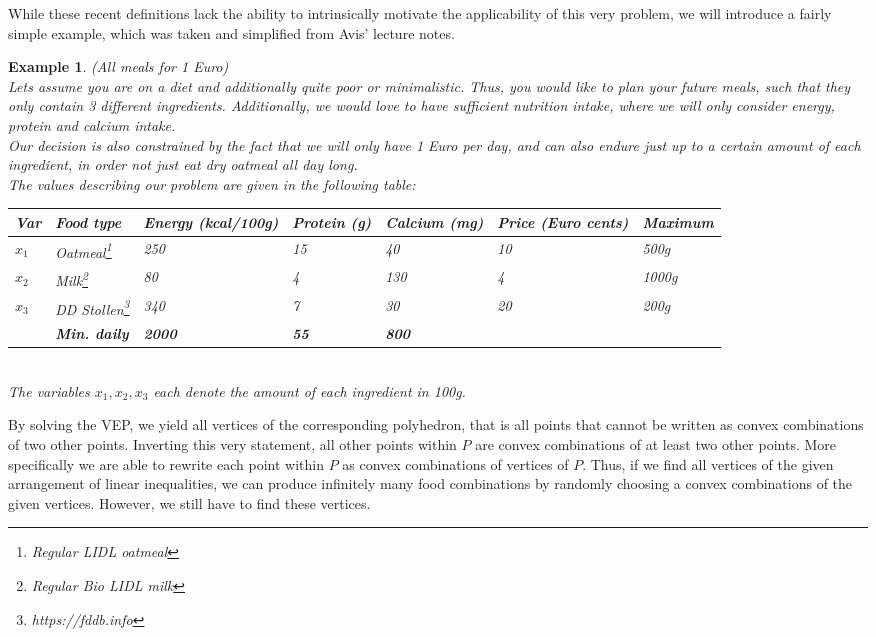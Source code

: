 \documentclass[a4paper, 11pt]{article}
\newtheorem{example}{Example}
\begin{document}
While these recent definitions lack the ability to intrinsically motivate the applicability of this very problem, we will introduce a fairly simple example, which was taken and simplified from Avis' lecture notes.
\begin{example}(All meals for 1 Euro)\\
	Lets assume you are on a diet and additionally quite poor or minimalistic. Thus, you would like to plan your future meals, such that they only contain 3 different ingredients. Additionally, we would love to have sufficient nutrition intake, where we will only consider energy, protein and calcium intake.\\
	Our decision is also constrained by the fact that we will only have 1 Euro per day, and can also endure just up to a certain amount of each ingredient, in order not just eat dry oatmeal all day long.\\
	The values describing our problem are given in the following table:\\
	\begingroup
	\def\arraystretch{1.5}
	\begin{tabular}{|p{0.5cm}|l|p{2cm}|p{1.5cm}|p{1.5cm}|p{1.5cm}|p{2cm}|}
		\hline
		Var&Food type&Energy (kcal/100g)&Protein (g)&Calcium (mg)&Price (Euro cents)&Maximum\\
		\hline
		$x_1$&Oatmeal\footnote{Regular LIDL oatmeal}&250&15&40&10&500g\\
		$x_2$&Milk\footnote{Regular Bio LIDL milk}&80&4&130&4&1000g\\
		$x_3$&DD Stollen\footnote{https://fddb.info}&340&7&30&20&200g\\
		\hline
		&\textbf{Min. daily}&\textbf{2000}&\textbf{55}&\textbf{800}&&\\
		\hline
	\end{tabular}
	\endgroup\\
	
	The variables $x_1, x_2, x_3$ each denote the amount of each ingredient in 100g.
\end{example}

By solving the VEP, we yield all vertices of the corresponding polyhedron, that is all points that cannot be written as convex combinations of two other points. Inverting this very statement, all other points within $P$ are convex combinations of at least two other points. More specifically we are able to rewrite each point within $P$ as convex combinations of vertices of $P$. Thus, if we find all vertices of the given arrangement of linear inequalities, we can produce infinitely many food combinations by randomly choosing a convex combinations of the given vertices. However, we still have to find these vertices.
\end{document}
